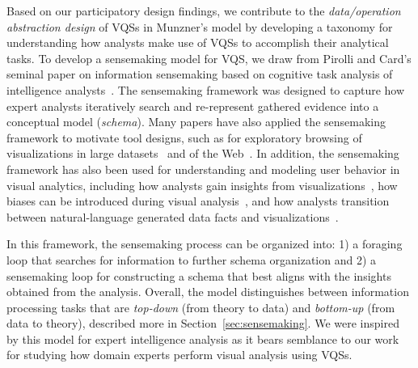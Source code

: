 {  \npar Based on our participatory design findings, we contribute to the \textit{data/operation abstraction design} of VQSs in Munzner's model by developing a taxonomy for understanding how analysts make use of VQSs to accomplish their analytical tasks. To develop a sensemaking model for VQS, we draw from Pirolli and Card's seminal paper on information sensemaking based on cognitive task analysis of intelligence analysts~\cite{Pirolli}. The sensemaking framework was designed to capture how expert analysts iteratively search and re-represent gathered evidence into a conceptual model (\emph{schema}). Many papers have also applied the sensemaking framework to motivate tool designs, such as for exploratory browsing of visualizations in large datasets~\cite{Battle2016} and of the Web~\cite{Olston2003}. In addition, the sensemaking framework has also been used for understanding and modeling user behavior in visual analytics, including how analysts gain insights from visualizations~\cite{Yi2008}, how biases can be introduced during visual analysis~\cite{Wall2017}, and how analysts transition between natural-language generated data facts and visualizations~\cite{Srinivasan2019}. 
  \par In this framework, the sensemaking process can be organized into: 1) a foraging loop that searches for information to further schema organization and 2) a sensemaking loop for constructing a schema that best aligns with the insights obtained from the analysis. Overall, the model distinguishes between information processing tasks that are \textit{top-down} (from theory to data) and \textit{bottom-up} (from data to theory), described more in Section~\ref{sec:sensemaking}. We were inspired by this model for expert intelligence analysis as it bears semblance to our work for studying how domain experts perform  visual analysis using VQSs.
 } 
  